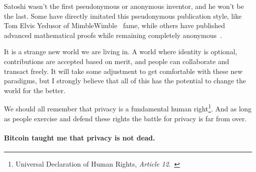Satoshi wasn't the first pseudonymous or anonymous inventor, and he won't be the
last. Some have directly imitated this pseudonymous publication style, like Tom
Elvis Yedusor of MimbleWimble~\cite{mimblewimble-origin} fame, while others have
published advanced mathematical proofs while remaining completely
anonymous~\cite{4chan-math}.

It is a strange new world we are living in. A world where identity is
optional, contributions are accepted based on merit, and people can
collaborate and transact freely. It will take some adjustment to get
comfortable with these new paradigms, but I strongly believe that all of
this has the potential to change the world for the better.

We should all remember that privacy is a fundamental human right\footnote{Universal Declaration of Human Rights, \textit{Article 12}.~\cite{article12}}. And as long
as people exercise and defend these rights the battle for privacy is far from
over.

\paragraph{Bitcoin taught me that privacy is not dead.}

%
%
%
%
